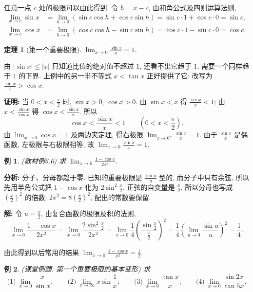 \documentclass[UTF8,openany]{ctexbook}
\theoremstyle{chinesetextbook}
\newtheorem{example}{例}[section]
\newtheorem{theorem}{定理}[section]
\newenvironment{cnproof}{\par\indent\textbf{证明:} \ignorespaces}{\par}
\newenvironment{cnsolution}{\par\indent\textbf{解:} \ignorespaces}{\par}
\begin{document}
任意一点 $c$ 处的极限可以由此得到. 令 $h=x-c$, 由和角公式及四则运算法则,
\[
\begin{aligned}
\lim_{x\to c}\sin x&=\lim_{h\to0}(\sin c\cos h+\cos c\sin h)=\sin c\cdot1+\cos c\cdot0=\sin c,\\
\lim_{x\to c}\cos x&=\lim_{h\to0}(\cos c\cos h-\sin c\sin h)=\cos c\cdot1-\sin c\cdot0=\cos c.
\end{aligned}
\]
\begin{theorem}[第一个重要极限]
$\displaystyle\lim_{x\to0}\frac{\sin x}x=1$.
\end{theorem}
由 $|\sin x|\le|x|$ 只知道比值的绝对值不超过 $1$, 还看不出它趋于 $1$, 需要一个同样趋于 $1$ 的下界. 上例中的另一半不等式 $x<\tan x$ 正好提供了它: 改写为 $\displaystyle\frac{\sin x}x>\cos x$.
\begin{cnproof}
当 $\displaystyle0<x<\frac\pi2$ 时, $\sin x>0$, $\cos x>0$. 由 $\sin x<x$ 得 $\displaystyle\frac{\sin x}x<1$; 由 $\displaystyle x<\frac{\sin x}{\cos x}$ 得 $\displaystyle\cos x<\frac{\sin x}x$. 所以
\[
\cos x<\frac{\sin x}x<1\qquad\left(0<x<\frac\pi2\right).
\]
由 $\displaystyle\lim_{x\to0}\cos x=1$ 及两边夹定理, 得右极限 $\displaystyle\lim_{x\to0^+}\frac{\sin x}x=1$. 由于 $\displaystyle\frac{\sin x}x$ 是偶函数, 左极限与右极限相等, 故 $\displaystyle\lim_{x\to0}\frac{\sin x}x=1$.
\end{cnproof}
\begin{example}\label{ex:6-6}
\textnormal{(教材例6.6)} 求 $\displaystyle\lim_{x\to0}\frac{1-\cos x}{2x^2}$.
\end{example}
\par\indent\textbf{分析:} 分子、分母都趋于零. 已知的重要极限是 $\displaystyle\frac{\sin u}u$ 型的, 而分子中只有余弦, 所以先用半角公式把 $1-\cos x$ 化为 $\displaystyle2\sin^2\frac x2$. 正弦的自变量是 $\displaystyle\frac x2$, 所以分母也写成 $\displaystyle\left(\frac x2\right)^2$ 的倍数: $\displaystyle2x^2=8\left(\frac x2\right)^2$, 配出的常数要保留.
\begin{cnsolution}
令 $\displaystyle u=\frac x2$, 由复合函数的极限及积的法则,
\[
\lim_{x\to0}\frac{1-\cos x}{2x^2}=\lim_{x\to0}\frac{2\sin^2\frac x2}{2x^2}=\lim_{x\to0}\frac14\left(\frac{\sin\frac x2}{\frac x2}\right)^2=\frac14\left(\lim_{u\to0}\frac{\sin u}u\right)^2=\frac14.
\]
\end{cnsolution}
由此得到以后常用的结果 $\displaystyle\lim_{x\to0}\frac{1-\cos x}{x^2}=\frac12$.
\begin{example}
\textnormal{(课堂例题: 第一个重要极限的基本变形)} 求
\[
\text{(1)}\ \lim_{x\to0}\frac x{\sin x};\qquad\text{(2)}\ \lim_{x\to\infty}x\sin\frac1x;\qquad\text{(3)}\ \lim_{x\to0}\frac{\tan x}x;\qquad\text{(4)}\ \lim_{x\to0}\frac{\sin2x}{\tan5x}.
\]
\end{example}
\end{document}
